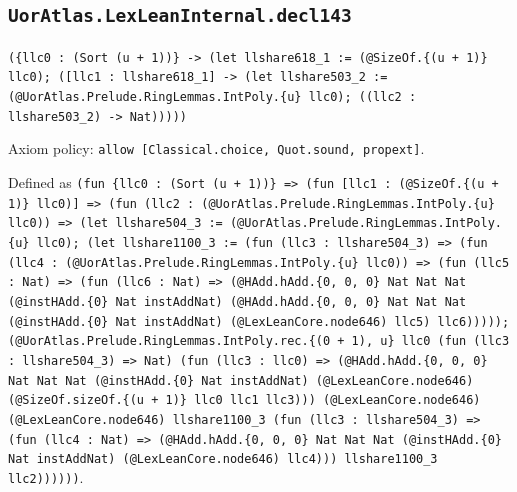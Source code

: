 \documentclass[11pt]{article}
\begin{document}
\subsection*{\texttt{UorAtlas.LexLeanInternal.decl143}}
\noindent\texttt{(\{llc0 : (Sort (u + 1))\} -> (let llshare618\_1 := (@SizeOf.\{(u + 1)\} llc0); ([llc1 : llshare618\_1] -> (let llshare503\_2 := (@UorAtlas.Prelude.RingLemmas.IntPoly.\{u\} llc0); ((llc2 : llshare503\_2) -> Nat)))))}\par
\noindent Axiom policy: \texttt{allow [Classical.choice, Quot.sound, propext]}.\par
\noindent Defined as \texttt{(fun \{llc0 : (Sort (u + 1))\} => (fun [llc1 : (@SizeOf.\{(u + 1)\} llc0)] => (fun (llc2 : (@UorAtlas.Prelude.RingLemmas.IntPoly.\{u\} llc0)) => (let llshare504\_3 := (@UorAtlas.Prelude.RingLemmas.IntPoly.\{u\} llc0); (let llshare1100\_3 := (fun (llc3 : llshare504\_3) => (fun (llc4 : (@UorAtlas.Prelude.RingLemmas.IntPoly.\{u\} llc0)) => (fun (llc5 : Nat) => (fun (llc6 : Nat) => (@HAdd.hAdd.\{0, 0, 0\} Nat Nat Nat (@instHAdd.\{0\} Nat instAddNat) (@HAdd.hAdd.\{0, 0, 0\} Nat Nat Nat (@instHAdd.\{0\} Nat instAddNat) (@LexLeanCore.node646) llc5) llc6))))); (@UorAtlas.Prelude.RingLemmas.IntPoly.rec.\{(0 + 1), u\} llc0 (fun (llc3 : llshare504\_3) => Nat) (fun (llc3 : llc0) => (@HAdd.hAdd.\{0, 0, 0\} Nat Nat Nat (@instHAdd.\{0\} Nat instAddNat) (@LexLeanCore.node646) (@SizeOf.sizeOf.\{(u + 1)\} llc0 llc1 llc3))) (@LexLeanCore.node646) (@LexLeanCore.node646) llshare1100\_3 (fun (llc3 : llshare504\_3) => (fun (llc4 : Nat) => (@HAdd.hAdd.\{0, 0, 0\} Nat Nat Nat (@instHAdd.\{0\} Nat instAddNat) (@LexLeanCore.node646) llc4))) llshare1100\_3 llc2))))))}.\par
\end{document}
